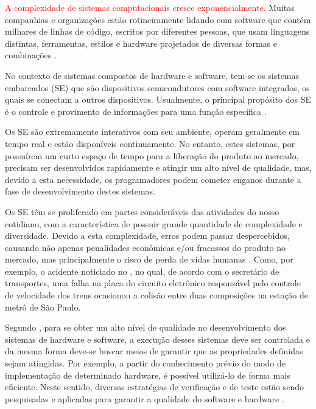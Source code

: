 \textcolor{red}{A complexidade de sistemas computacionais cresce exponencialmente.}  Muitas companhias e organizações estão rotineiramente lidando com software que contém milhares de linhas de código, escritos por diferentes pessoas, que usam linguagens distintas, ferramentas, estilos e hardware projetados de diversas formas e combinações \cite{hoder2011case}. 

\par
No contexto de sistemas compostos de hardware e software, tem-se os sistemas embarcados (SE) que são dispositivos semicondutores com software integrados, os quais se conectam a outros dispositivos. Usualmente, o principal propósito dos SE é o controle e provimento de informações para uma função específica \cite{ramesh2012energy}. 

\par
Os SE são extremamente interativos com seu ambiente, operam geralmente em tempo real e estão disponíveis continuamente. No entanto, estes sistemas, por possuírem um curto espaço de tempo para a liberação do produto ao mercado, precisam ser desenvolvidos rapidamente e atingir um alto nível de qualidade, mas, devido a esta necessidade, os programadores podem cometer enganos durante a fase de desenvolvimento destes sistemas.

\par
Os SE têm se proliferado em partes consideráveis das atividades do nosso cotidiano, com a característica de possuir grande quantidade de complexidade e diversidade. Devido a esta complexidade, erros podem passar despercebidos, causando não apenas penalidades econômicas e/ou fracassos do produto no mercado, mas principalmente o risco de perda de vidas humanas \cite{cabodi2016hardware}. Como, por exemplo, o acidente noticiado no \cite{g1Acidente}, no qual, de acordo com o secretário de transportes, uma falha na placa do circuito eletrônico responsável pelo controle de velocidade dos trens ocasionou a colisão entre duas composições na estação de metrô de São Paulo.

\par
Segundo \citeauthor{rocha2015verificaccao}\citeyear{rocha2015verificaccao}, para se obter um alto nível de qualidade no desenvolvimento dos sistemas de hardware e software, a execução desses sistemas deve ser controlada e da mesma forma deve-se buscar meios de garantir que as propriedades definidas sejam atingidas. Por exemplo, a partir do conhecimento prévio do modo de implementação de determinado hardware, é possível utilizá-lo de forma mais eficiente. Neste sentido, diversas estratégias de verificação e de teste estão sendo pesquisadas e aplicadas para garantir a qualidade do software e hardware \cite{hoder2010interpolation,rocha2010exploiting,brayton2010abc,cordeiro2012smt,cabodi2016hardware}.

